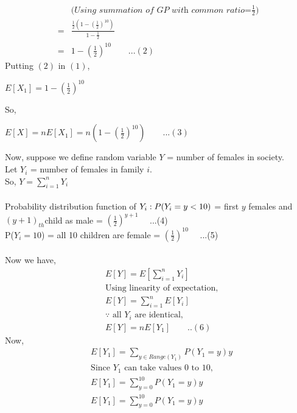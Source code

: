 \documentclass[12pt]{article}
\begin{document}
\begin{solution}
\begin{align*}
            &\textit{(Using summation of GP with common ratio=$\frac{1}{2}$)}\\
            =& \frac{\frac{1}{2}(1-(\frac{1}{2})^{10})}{1-\frac{1}{2}}\\
            =&1-(\frac{1}{2})^{10}\quad\quad...(2)
        \end{align*}
        Putting $(2)$ in $(1)$,
        \begin{center}
        $E[X_1] = 1-(\frac{1}{2})^{10}$
        \end{center}
        So, 
        \begin{center}
        $E[X] = nE[X_1] = n(1-(\frac{1}{2})^{10})\quad\quad...(3)$\\
        \end{center}
        \vspace{10mm}
        Now, suppose we define random variable $Y$ = number of females in society.\\
        Let $Y_i$  = number of females in family $i$.\\
        So, $Y=\sum_{i=1}^{n}Y_i$\\\\
        Probability distribution function of $Y_i:\\P(Y_i=y<10)$ = first $y$ females and $(y+1)_{th}$child as male = $(\frac{1}{2})^{y+1}\quad$     ...(4)\\
        P($Y_i=10$) = all 10 children are female = $(\frac{1}{2})^{10}\quad$         ...(5)\\\\
        Now we have,
        \begin{align*}
            & E[Y] = E[\sum_{i=1}^{n}Y_i]\\
            & \text{Using linearity of expectation,}\\
            & E[Y] = \sum_{i=1}^{n}E[Y_i]\\
            & \text{$\because$ all $Y_i$ are identical,}\\
            &E[Y]=nE[Y_1] \quad\quad..(6)
        \end{align*}
        Now,
        \begin{align*}
            & E[Y_1] = \sum_{y \in Range(Y_1)}P(Y_1=y)y\\
            & \text{Since $Y_1$ can take values 0 to 10,}\\
            & E[Y_1] = \sum_{y=0}^{10}P(Y_1=y)y\\
            & E[Y_1] = \sum_{y=0}^{10}P(Y_1=y)y\\

\end{align*}
\end{solution}
\end{document}
